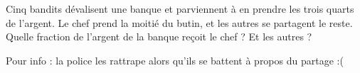 
\begin{exercice}\label{exosmath-0884}

    Cinq bandits dévalisent une banque et parviennent à en prendre les trois quarts de l'argent. Le chef prend la moitié du butin, et les autres se partagent le reste. Quelle fraction de l'argent de la banque reçoit le chef ? Et les autres ?

    Pour info : la police les rattrape alors qu'ils se battent à propos du partage :(

\end{exercice}
